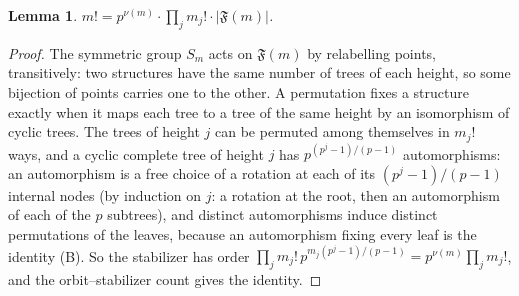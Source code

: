 \documentclass[11pt]{article}
\newtheorem{lemma}[theorem]{Lemma}
\theoremstyle{definition}
\theoremstyle{remark}
\numberwithin{equation}{section}
\numberwithin{figure}{section}
\newcommand{\F}{\mathfrak F}
\begin{document}
\begin{lemma}\label{acc:L3}
$m!=p^{\nu(m)}\cdot\prod_jm_j!\cdot|\F(m)|$.
\end{lemma}
\begin{proof}
The symmetric group $S_m$ acts on $\F(m)$ by relabelling points, transitively: two structures
have the same number of trees of each height, so some bijection of points carries one to the
other. A permutation fixes a structure exactly when it maps each tree to a tree of the same
height by an isomorphism of cyclic trees. The trees of height $j$ can be permuted among
themselves in $m_j!$ ways, and a cyclic complete tree of height $j$ has
$p^{(p^j-1)/(p-1)}$ automorphisms: an automorphism is a free choice of a rotation at each of
its $(p^j-1)/(p-1)$ internal nodes (by induction on $j$: a rotation at the root, then an
automorphism of each of the $p$ subtrees), and distinct automorphisms induce distinct
permutations of the leaves, because an automorphism fixing every leaf is the identity (B).
So the stabilizer has order
$\prod_j m_j!\,p^{m_j(p^j-1)/(p-1)}=p^{\nu(m)}\prod_jm_j!$, and the orbit--stabilizer count
gives the identity.
\end{proof}
\end{document}
